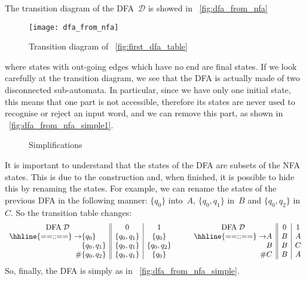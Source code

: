 The transition diagram of the DFA~\(\mathcal{D}\) is showed in
\fig~\vref{fig:dfa_from_nfa}
\begin{figure}[b]
\centering
\texttt{[image: dfa\_from\_nfa]}
\caption{Transition diagram of \fig~\vref{fig:first_dfa_table}}
\label{fig:dfa_from_nfa}
\end{figure}
where states with out-going edges which have no end are final
states. If we look carefully at the transition diagram, we see that
the DFA is actually made of two disconnected sub\hyp{}automata. In
particular, since we have only one initial state, this means that one
part is not accessible, therefore its states are never used to
recognise or reject an input word, and we can remove this part, as
shown in \fig~\ref{fig:dfa_from_nfa_simple1}.
\begin{figure}
\centering
{}
\qquad
{}
\caption{Simplifications}
\end{figure}
It is important to understand that the states of the DFA are subsets
of the NFA states. This is due to the construction and, when finished,
it is possible to hide this by renaming the states. For example, we
can rename the states of the previous DFA in the following manner:
\(\{q_0\}\) into~\(A\), \(\{q_0, q_1\}\) in~\(B\) and \(\{q_0, q_2\}\)
in~\(C\). So the transition table changes:
\begin{equation*}
  \begin{array}{r@{}l||c|c}
    \multicolumn{2}{c||}{\text{DFA} \; \mathcal{D}} & 0 & 1\\
    \hhline{==::==}
    \rightarrow & \{q_0\}     & \{q_0, q_1\} & \{q_0\}\\
                & \{q_0,q_1\} & \{q_0,q_1\}  & \{q_0,q_2\}\\
             \# & \{q_0,q_2\} & \{q_0,q_1\}  & \{q_0\}
  \end{array}
\qquad
  \begin{array}{r@{}l||c|c}
    \multicolumn{2}{c||}{\text{DFA} \; \mathcal{D}} & 0 & 1\\
    \hhline{==::==}
    \rightarrow & A & B & A\\
                & B & B & C\\
             \# & C & B & A
  \end{array}
\end{equation*}
So, finally, the DFA is simply as in \fig~\vref{fig:dfa_from_nfa_simple}.

